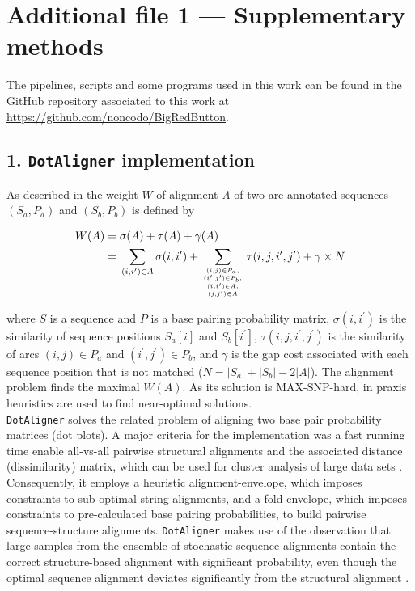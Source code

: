 \documentclass{bmcart}
\newcommand\dotaligner{\texttt{DotAligner}}
\begin{document}
\clearpage

\section*{Additional file 1 --- Supplementary methods}
The pipelines, scripts and some programs used in this work can be found in the 
GitHub repository associated to this work at \url{https://github.com/noncodo/BigRedButton}. 

\subsection*{ 1. \dotaligner{} implementation }
\noindent As described in \cite{Palu2010} the weight $W$ of alignment \emph{A}
of two arc-annotated sequences $(S_a,P_a)$ and $(S_b,P_b)$ is defined by

\begin{equation}\label{eq1}
\begin{aligned}
	W(A) ={} & \sigma(A) + \tau(A) + \gamma(A) \\
	     ={} & \sum_{(i,i^\prime) \in A} \sigma(i,i^\prime) + \sum_{(i,j) \in
	P_a,\atop {(i^\prime,j^\prime) \in P_b,\atop {(i,i^\prime) \in
	A,\atop (j,j^\prime) \in A}}} \tau(i,j,i^\prime,j^\prime) + \gamma
	\times N
\end{aligned}
\end{equation}

\noindent where $S$ is a sequence and $P$ is a base pairing probability matrix,
$\sigma(i,i^\prime)$ is the similarity of sequence positions $S_a[i]$ and
$S_b[i^\prime]$, $\tau(i,j,i^\prime,j^\prime)$ is the similarity of arcs $(i,j)
\in P_a$ and $(i^\prime,j^\prime) \in P_b$,
and $\gamma$ is the gap cost associated with each sequence position that is not
matched ($N = |S_a|+|S_b|-2|A|$). The alignment problem finds the maximal
$W(A)$. As its solution is MAX-SNP-hard, in praxis heuristics are used to find
near-optimal solutions.\\

\dotaligner{} solves the related problem of aligning two base pair
probability matrices (dot plots). A major criteria for the implementation was a fast
running time enable all-vs-all pairwise structural alignments and the 
associated distance (dissimilarity) matrix, which can be used for 
cluster analysis of large data sets \cite{Will17432929}. Consequently, 
it employs a heuristic alignment-envelope, 
which imposes constraints to sub-optimal string alignments, 
and a fold-envelope, which imposes constraints to pre-calculated base pairing probabilities, 
to build pairwise sequence-structure alignments. 
\dotaligner{} makes use of the observation that large samples from the ensemble 
of stochastic sequence alignments contain the correct structure-based alignment
with significant probability,  even though the optimal
sequence alignment deviates significantly from the structural alignment
\cite{Muckstein12385998}. \\
\end{document}
